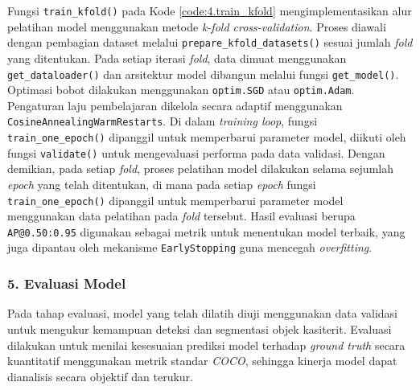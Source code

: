Fungsi \texttt{train\_kfold()} pada Kode \ref{code:4.train_kfold} mengimplementasikan alur pelatihan model menggunakan metode \textit{k-fold cross-validation}. Proses diawali dengan pembagian dataset melalui \texttt{prepare\_kfold\_datasets()} sesuai jumlah \textit{fold} yang ditentukan. Pada setiap iterasi \textit{fold}, data dimuat menggunakan \texttt{get\_dataloader()} dan arsitektur model dibangun melalui fungsi \texttt{get\_model()}. Optimasi bobot dilakukan menggunakan \texttt{optim.SGD} atau \texttt{optim.Adam}. Pengaturan laju pembelajaran dikelola secara adaptif menggunakan \texttt{CosineAnnealingWarmRestarts}. Di dalam \textit{training loop}, fungsi \texttt{train\_one\_epoch()} dipanggil untuk memperbarui parameter model, diikuti oleh fungsi \texttt{validate()} untuk mengevaluasi performa pada data validasi. Dengan demikian, pada setiap \textit{fold}, proses pelatihan model dilakukan selama sejumlah \textit{epoch} yang telah ditentukan, di mana pada setiap \textit{epoch} fungsi \texttt{train\_one\_epoch()} dipanggil untuk memperbarui parameter model menggunakan data pelatihan pada \textit{fold} tersebut. Hasil evaluasi berupa \texttt{AP@0.50:0.95} digunakan sebagai metrik untuk menentukan model terbaik, yang juga dipantau oleh mekanisme \texttt{EarlyStopping} guna mencegah \textit{overfitting}. \par

\subsubsection*{\textnormal{5. Evaluasi Model}}
Pada tahap evaluasi, model yang telah dilatih diuji menggunakan data validasi untuk mengukur kemampuan deteksi dan segmentasi objek kasiterit. Evaluasi dilakukan untuk menilai kesesuaian prediksi model terhadap \textit{ground truth} secara kuantitatif menggunakan metrik standar \textit{COCO}, sehingga kinerja model dapat dianalisis secara objektif dan terukur.

